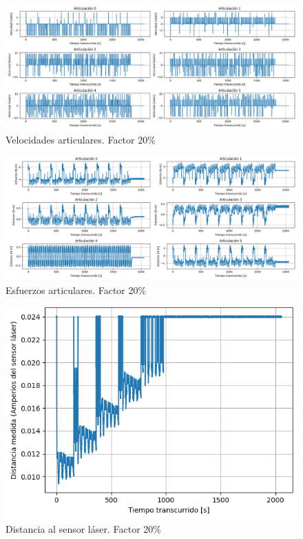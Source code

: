 \begin{figure}[H]
    \centering
    \includegraphics[scale=0.30]{figuras/ensayo_control_velocidad/velocidad articular 0.2.png}
    \caption{Velocidades articulares. Factor 20\%}
    \label{fig:velocidades articulares 0.2}
\end{figure}

\begin{figure}[H]
    \centering
    \includegraphics[scale=0.30]{figuras/ensayo_control_velocidad/esfuerzos 0.2.png}
    \caption{Esfuerzos articulares. Factor 20\%}
    \label{fig:esfuerzos articulares 0.2}
\end{figure}

\begin{figure}[H]
    \centering
    \includegraphics[scale=0.50]{figuras/ensayo_control_velocidad/laser 0.2.png}
    \caption{Distancia al sensor láser. Factor 20\%}
    \label{fig:laser 0.2}
\end{figure}


